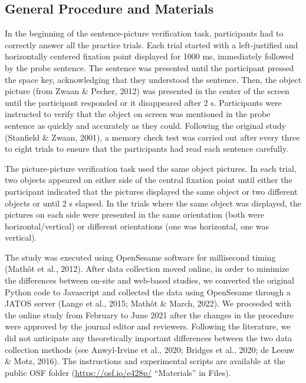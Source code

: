 \documentclass[
  man,floatsintext]{apa7}
\begin{document}
\hypertarget{general-procedure-and-materials}{%
\subsection{General Procedure and Materials}\label{general-procedure-and-materials}}

In the beginning of the sentence-picture verification task, participants had to correctly answer all the practice trials. Each trial started with a left-justified and horizontally centered fixation point displayed for 1000 ms, immediately followed by the probe sentence. The sentence was presented until the participant pressed the space key, acknowledging that they understood the sentence. Then, the object picture (from Zwaan \& Pecher, 2012) was presented in the center of the screen until the participant responded or it disappeared after 2 s. Participants were instructed to verify that the object on screen was mentioned in the probe sentence as quickly and accurately as they could. Following the original study (Stanfield \& Zwaan, 2001), a memory check test was carried out after every three to eight trials to ensure that the participants had read each sentence carefully.

The picture-picture verification task used the same object pictures. In each trial, two objects appeared on either side of the central fixation point until either the participant indicated that the pictures displayed the same object or two different objects or until 2 s elapsed. In the trials where the same object was displayed, the pictures on each side were presented in the same orientation (both were horizontal/vertical) or different orientations (one was horizontal, one was vertical).

The study was executed using OpenSesame software for millisecond timing (Mathôt et al., 2012). After data collection moved online, in order to minimize the differences between on-site and web-based studies, we converted the original Python code to Javascript and collected the data using OpenSesame through a JATOS server (Lange et al., 2015; Mathôt \& March, 2022). We proceeded with the online study from February to June 2021 after the changes in the procedure were approved by the journal editor and reviewers. Following the literature, we did not anticipate any theoretically important differences between the two data collection methods (see Anwyl-Irvine et al., 2020; Bridges et al., 2020; de Leeuw \& Motz, 2016). The instructions and experimental scripts are available at the public OSF folder (\url{https://osf.io/e428p/} ``Materials'' in Files).
\end{document}
